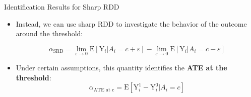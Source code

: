 \documentclass[dvipsnames,hyperref={pdfpagelabels=false}]{beamer}
\begin{document}
\begin{frame}{Identification Results for Sharp RDD}{}
	\begin{itemize}
		
		\item Instead, we can use sharp RDD to investigate the behavior of the outcome around the threshold:
		
		\begin{equation*}
		\alpha_{\text{SRD}} = \lim_{\varepsilon\rightarrow 0}\mathrm{E}[\mathrm{Y}_{i}|A_i=c+\varepsilon] - \lim_{\varepsilon\rightarrow 0}\mathrm{E}[\mathrm{Y}_{i}|A_i=c-\varepsilon] 
		\end{equation*}	
		
		
		
		\item Under certain assumptions, this quantity identifies the \textbf{ATE at the threshold}:
		\begin{equation*}
		\alpha_{\text{ATE at c}}=\mathrm{E}[\mathrm{Y}^{1}_{i}-\mathrm{Y}^{0}_{i}|A_i=c]
		\end{equation*}
	\end{itemize}
\end{frame}
\end{document}
